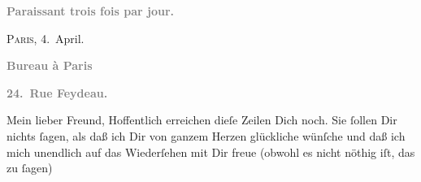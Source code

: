 \pstart
           \begin{otherlanguage}{french}\textcolor{gray}{\textbf{\textbf{Paraissant trois fois par jour.}}}\end{otherlanguage}\hfill \textsc{Paris}, 4. April.\pend
           
\pstart
           \begin{otherlanguage}{french}\textcolor{gray}{\textbf{\textbf{Bureau à Paris}}}\end{otherlanguage}\pend
           
\pstart
           \begin{otherlanguage}{french}\textcolor{gray}{\textbf{\textbf{24. Rue Feydeau.}}}\end{otherlanguage}\pend
           
\pstart\center{}Mein lieber Freund,\pend\vspace{0.5em}
\pstart
           Hoffentlich erreichen dieſe Zeilen Dich noch. Sie{ }ſollen Dir nichts{ }ſagen, als daß
               ich Dir von ganzem Herzen glückliche \label{K_L02807-1v}\label{K_L02807-1} wünſche und daß ich mich unendlich auf das
               Wiederſehen mit Dir freue (obwohl es nicht nöthig iſt, das zu{ }ſagen) {\dotsfour}\pend
           
